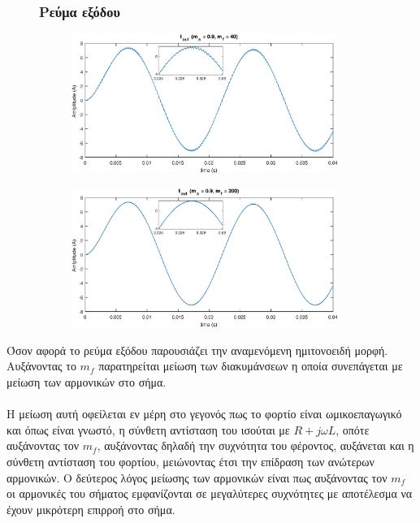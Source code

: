 \begin{figure}[h!]
	\subsubsection*{Ρεύμα εξόδου}
	\begin{subfigure}{0.49\textwidth}
		\centering
		\includegraphics[width=0.95\textwidth]{Images/I_out_40}
	\end{subfigure}
	\begin{subfigure}{0.49\textwidth}
		\centering
		\includegraphics[width=0.95\textwidth]{Images/I_out_200}
	\end{subfigure}
\end{figure}
\noindent
Όσον αφορά το ρεύμα εξόδου παρουσιάζει την αναμενόμενη ημιτονοειδή μορφή. Αυξάνοντας το $m_f$ παρατηρείται μείωση των διακυμάνσεων η οποία συνεπάγεται με μείωση των αρμονικών στο σήμα.\\\\
Η μείωση αυτή οφείλεται εν μέρη στο γεγονός πως το φορτίο είναι ωμικοεπαγωγικό και όπως είναι γνωστό, η σύνθετη αντίσταση του ισούται με $R + j\omega L$, οπότε αυξάνοντας τον $m_f$, αυξάνοντας δηλαδή την συχνότητα του φέροντος, αυξάνεται και η σύνθετη αντίσταση του φορτίου, μειώνοντας  έτσι την επίδραση των ανώτερων αρμονικών. Ο δεύτερος λόγος μείωσης των αρμονικών είναι πως  αυξάνοντας τον $m_f$ οι αρμονικές του σήματος εμφανίζονται σε μεγαλύτερες συχνότητες με αποτέλεσμα να έχουν μικρότερη επιρροή στο σήμα.\\
